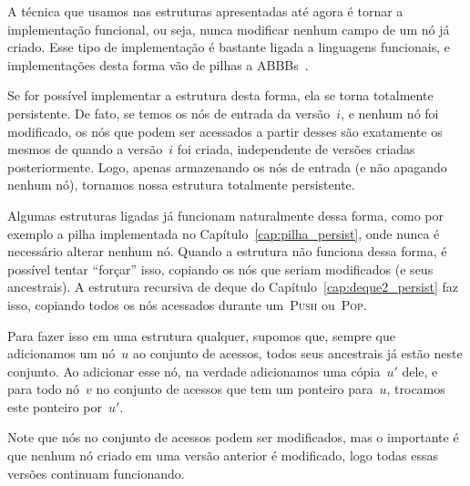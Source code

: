 \documentclass[../../main.tex]{subfiles}
\begin{document}
A técnica que usamos nas estruturas apresentadas até agora é tornar a implementação funcional, ou seja, nunca modificar nenhum campo de um nó já criado. Esse tipo de implementação é bastante ligada a linguagens funcionais, e implementações desta forma vão de pilhas a ABBBs~\cite{HoodMelville,KaplanT1999,Myers82,Myers83,Myers84}.

Se for possível implementar a estrutura desta forma, ela se torna totalmente persistente. De fato, se temos os nós de entrada da versão~$i$, e nenhum nó foi modificado, os nós que podem ser acessados a partir desses são exatamente os mesmos de quando a versão~$i$ foi criada, independente de versões criadas posteriormente. Logo, apenas armazenando os nós de entrada (e não apagando nenhum nó), tornamos nossa estrutura totalmente persistente.

Algumas estruturas ligadas já funcionam naturalmente dessa forma, como por exemplo a pilha implementada no Capítulo~\ref{cap:pilha_persist}, onde nunca é necessário alterar nenhum nó. Quando a estrutura não funciona dessa forma, é possível tentar ``forçar'' isso, copiando os nós que seriam modificados (e seus ancestrais). A estrutura recursiva de deque do Capítulo~\ref{cap:deque2_persist} faz isso, copiando todos os nós acessados durante um~\textsc{Push} ou~\textsc{Pop}.

Para fazer isso em uma estrutura qualquer, supomos que, sempre que adicionamos um nó~$u$ ao conjunto de acessos, todos seus ancestrais já estão neste conjunto. Ao adicionar esse nó, na verdade adicionamos uma cópia~$u'$ dele, e para todo nó~$v$ no conjunto de acessos que tem um ponteiro para~$u$, trocamos este ponteiro por~$u'$.

Note que nós no conjunto de acessos podem ser modificados, mas o importante é que nenhum nó criado em uma versão anterior é modificado, logo todas essas versões continuam funcionando.
\end{document}
